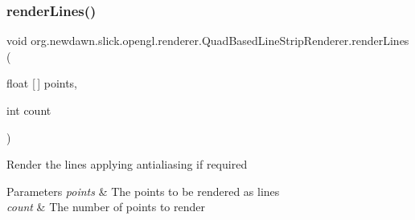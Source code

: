 \subsubsection{\texorpdfstring{render\+Lines()}{renderLines()}}
{\footnotesize\ttfamily void org.\+newdawn.\+slick.\+opengl.\+renderer.\+Quad\+Based\+Line\+Strip\+Renderer.\+render\+Lines (\begin{DoxyParamCaption}\item[{float \mbox{[}$\,$\mbox{]}}]{points,  }\item[{int}]{count }\end{DoxyParamCaption})\hspace{0.3cm}{\ttfamily [inline]}}

Render the lines applying antialiasing if required


\begin{DoxyParams}{Parameters}
{\em points} & The points to be rendered as lines \\
\hline
{\em count} & The number of points to render \\
\hline
\end{DoxyParams}

